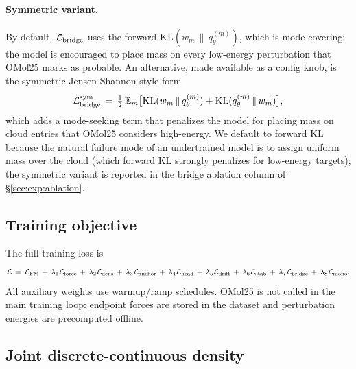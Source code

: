 \documentclass{article}
\begin{document}
\paragraph{Symmetric variant.}
By default, $\mathcal L_{\rm bridge}$ uses the forward
$\mathrm{KL}(w_m\,\|\,q^{(m)}_\theta)$, which is mode-covering: the model
is encouraged to place mass on every low-energy perturbation that
OMol25 marks as probable. An alternative, made available as a config
knob, is the symmetric Jensen-Shannon-style form
\begin{equation}
    \mathcal L_{\rm bridge}^{\rm sym}
    \,=\, \tfrac{1}{2}\,\mathbb E_m\bigl[
        \mathrm{KL}(w_m\,\|\,q^{(m)}_\theta) +
        \mathrm{KL}(q^{(m)}_\theta\,\|\,w_m)\bigr],
    \label{eq:bridge-sym}
\end{equation}
which adds a mode-seeking term that penalizes the model for placing
mass on cloud entries that OMol25 considers high-energy. We default to
forward KL because the natural failure mode of an undertrained model is
to assign uniform mass over the cloud (which forward KL strongly
penalizes for low-energy targets); the symmetric variant is reported in
the bridge ablation column of \S\ref{sec:exp:ablation}.

\subsection{Training objective}

The full training loss is
\begin{equation}
    \mathcal L \,=\, \mathcal L_{\rm FM}
    \,+\, \lambda_1 \mathcal L_{\rm force}
    \,+\, \lambda_2 \mathcal L_{\rm dens}
    \,+\, \lambda_3 \mathcal L_{\rm anchor}
    \,+\, \lambda_4 \mathcal L_{\rm head}
    \,+\, \lambda_5 \mathcal L_{\rm drift}
    \,+\, \lambda_6 \mathcal L_{\rm stab}
    \,+\, \lambda_7 \mathcal L_{\rm bridge}
    \,+\, \lambda_8 \mathcal L_{\rm mono}.
    \label{eq:total-loss}
\end{equation}
All auxiliary weights use warmup/ramp schedules. OMol25 is not called
in the main training loop: endpoint forces are stored in the dataset
and perturbation energies are precomputed offline.

\subsection{Joint discrete-continuous density}
\label{sec:method:joint}
\end{document}
